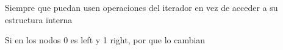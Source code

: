 
\begin{DoxyRefList}
\item[\label{bug__bug000001}%
\hypertarget{bug__bug000001}{}%
Miembro \hyperlink{classaed2_1_1map_a0b0a11f906da2926f9eb342fcee79fd7_a0b0a11f906da2926f9eb342fcee79fd7}{aed2\+:\+:map$<$ Key, Meaning, Compare $>$\+:\+:at} (const Key \&key) const ]Siempre que puedan usen operaciones del iterador en vez de acceder a su estructura interna 
\item[\label{bug__bug000002}%
\hypertarget{bug__bug000002}{}%
Miembro \hyperlink{classaed2_1_1map_a54b1ea9f8c707232c744a4ac5c5302d2_a54b1ea9f8c707232c744a4ac5c5302d2}{aed2\+:\+:map$<$ Key, Meaning, Compare $>$\+:\+:Rotate} (\hyperlink{structaed2_1_1map_1_1Node}{Node} $\ast$n, int i)]Si en los nodos 0 es left y 1 right, por que lo cambian
\end{DoxyRefList}